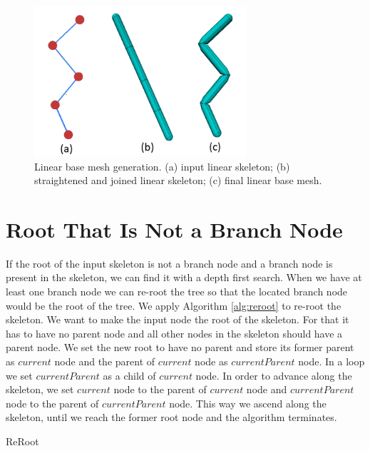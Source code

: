 \begin{figure}[ht]
    \centering
    \includegraphics[width=0.7\textwidth]{images/worm_generation}
    \caption[Linear base mesh]{Linear base mesh generation. (a) input linear skeleton; (b) straightened and joined linear skeleton; (c) final linear base mesh.}
    \label{fig:worm_ilu}
\end{figure}

\section{Root That Is Not a Branch Node}
If the root of the input skeleton is not a branch node and a branch node is present in the skeleton, we can find it with a depth first search.
When we have at least one branch node we can re-root the tree so that the located branch node would be the root of the tree.
We apply Algorithm \ref{alg:reroot} to re-root the skeleton.
We want to make the input node the root of the skeleton.
For that it has to have no parent node and all other nodes in the skeleton should have a parent node.
We set the new root to have no parent and store its former parent as $current$ node and the parent of $current$ node as $currentParent$ node.
In a loop we set $currentParent$ as a child of $current$ node.
In order to advance along the skeleton, we set $current$ node to the parent of $current$ node and $currentParent$ node to the parent of $currentParent$ node.
This way we ascend along the skeleton, until we reach the former root node and the algorithm terminates.
\begin{algorithm}[h]
\caption{ReRoot}
\label{alg:reroot}
\begin{algorithmic}

	\ENDWHILE
\end{algorithmic}
\end{algorithm}

